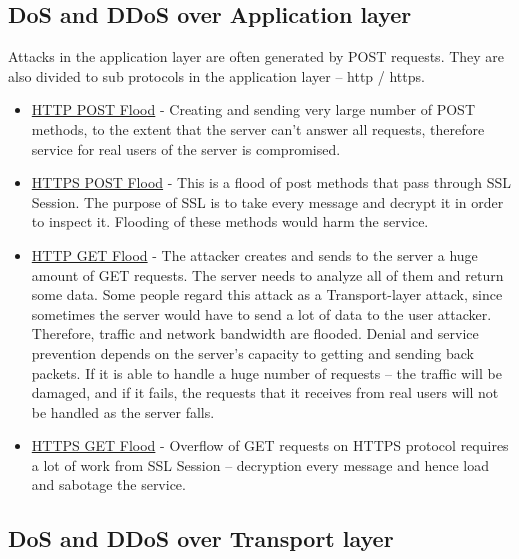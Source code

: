 \documentclass{report}
\begin{document}
\subsection {DoS and DDoS over Application layer} 
 \hfill \break Attacks in the application layer are often generated by POST requests. They are also divided to sub protocols in the application layer – http / https.
\begin{itemize}
\item\underline {HTTP POST Flood} 
- Creating and sending very large number of POST methods, to the extent that the server can't answer all requests, therefore service for real users of the server is compromised.

\item\underline{HTTPS POST Flood} - This is a flood of post methods that pass through \gls{SSL} Session. The purpose of \gls{SSL} is to take every message and decrypt it in order to inspect it. Flooding of these methods would harm the service.
\newpage
\item\underline{HTTP GET Flood} - The attacker creates and sends to the server a huge amount of GET requests. The server needs to analyze all of them and return some data. Some people regard this attack as a Transport-layer attack, since sometimes the server would have to send a lot of data to the user attacker. Therefore, traffic and network bandwidth are flooded. Denial and service prevention depends on the server’s capacity to getting and sending back packets. If it is able to handle a huge number of requests – the traffic will be damaged, and if it fails, the requests that it receives from real users will not be handled as the server falls.

\item\underline{HTTPS GET Flood} - Overflow of GET requests on HTTPS protocol requires a lot of work from \gls{SSL} Session – decryption every message and hence load and sabotage the service.
\end{itemize}
\hfill \break
\subsection {DoS and DDoS over Transport layer} 
\end{document}
